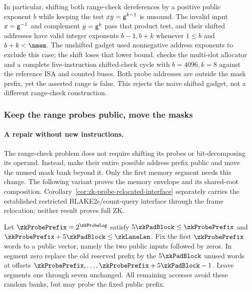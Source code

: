 In particular, shifting both range-check dereferences by a positive public exponent $b$ while keeping the test $xy=\mathsf{g}^{k-1}$ is unsound. The invalid input $x=\mathsf{g}^{-1}$ and complement $y=\mathsf{g}^k$ pass that product test, and their shifted addresses have valid integer exponents $b-1,b+k$ whenever $1\le b$ and $b+k<\nmem$. The unshifted gadget used nonnegative address exponents to exclude this case; the shift loses that lower bound.  checks the multi-slot allocator and a complete five-instruction shifted-check cycle with $b=4096,k=8$ against the reference ISA and counted buses. Both probe addresses are outside the mask prefix, yet the asserted range is false. This rejects the naive shifted gadget, not a different range-check construction.

\subsubsection{Keep the range probes public, move the masks}

\paragraph{A repair without new instructions.} The range-check problem does not require shifting its probes or bit-decomposing its operand. Instead, make their entire possible address prefix public and move the unused mask bank beyond it. Only the first memory segment needs this change. The following variant proves the memory envelope and its shared-root composition. Corollary~\ref{cor:zk-probe-relocated-interface} separately carries the established restricted BLAKE2s/count-query interface through the frame relocation; neither result proves full ZK.

Let $\zkProbePrefix=2^{\zkProbeLog}$ satisfy $5\zkPadBlock\le\zkProbePrefix$ and $\zkProbePrefix+5\zkPadBlock\le\zkLaneLen$. Fix the first $\zkProbePrefix$ words to a public vector, namely the two public inputs followed by zeros. In segment zero replace the old reserved prefix by the $5\zkPadBlock$ unused words at offsets $\zkProbePrefix,\ldots,\zkProbePrefix+5\zkPadBlock-1$. Leave segments one through seven unchanged. All remaining accesses avoid these random banks, but may probe the fixed public prefix.

